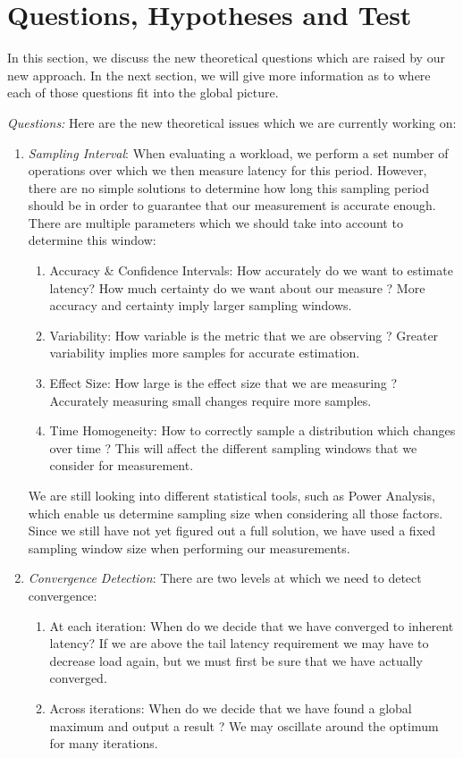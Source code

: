 \documentclass[12pt]{article}
\begin{document}
\section{Questions, Hypotheses and Test}

In this section, we discuss the new theoretical questions which are raised by our new approach. In the next section, we will give more information as to where each of those questions fit into the global picture.
\singlespacing


\noindent \textit{Questions:} Here are the new theoretical issues which we are currently working on: 

\begin{enumerate}
	\item \textit{Sampling Interval}: When evaluating a workload, we perform a set number of operations over which we then measure latency for this period. However, there are no simple solutions to determine how long this sampling period should be in order to guarantee that our measurement is accurate enough. There are multiple parameters which we should take into account to determine this window:
		\begin{enumerate}
			\item Accuracy \& Confidence Intervals: How accurately do we want to estimate latency? How much certainty do we want about our measure ? More accuracy and certainty imply larger sampling windows.
			\item Variability: How variable is the metric that we are observing ? Greater variability implies more samples for accurate estimation.
			\item Effect Size: How large is the effect size that we are measuring ? Accurately measuring small changes require more samples.
			\item Time Homogeneity: How to correctly sample a distribution which changes over time ? This will affect the different sampling windows that we consider for measurement.
		\end{enumerate}

		We are still looking into different statistical tools, such as Power Analysis, which enable us determine sampling size when considering all those factors. Since we still have not yet figured out a full solution, we have used a fixed sampling window size when performing our measurements.

	\item \textit{Convergence Detection}: There are two levels at which we need to detect convergence:
		\begin{enumerate}[label=2.\arabic*.]
			\item At each iteration: When do we decide that we have converged to inherent latency? If we are above the tail latency requirement we may have to decrease load again, but we must first be sure that we have actually converged.
			\item Across iterations: When do we decide that we have found a global maximum and output a result ? We may oscillate around the optimum for many iterations.
		\end{enumerate}


\end{enumerate}
\end{document}
